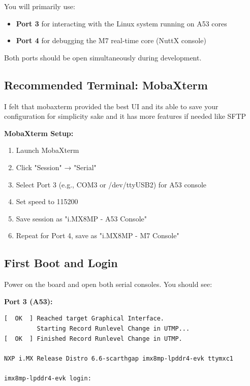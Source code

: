\documentclass[12pt,a4paper]{report}
\begin{document}
\begin{important}
You will primarily use:
\begin{itemize}
    \item \textbf{Port 3} for interacting with the Linux system running on A53 cores
    \item \textbf{Port 4} for debugging the M7 real-time core (NuttX console)
\end{itemize}
Both ports should be open simultaneously during development.
\end{important}


\subsection{Recommended Terminal: MobaXterm}

I felt that mobaxterm provided the best UI and its able to save your configuration for simplicity sake and it has more features if needed like SFTP


\textbf{MobaXterm Setup:}
\begin{enumerate}
    \item Launch MobaXterm
    \item Click "Session" → "Serial"
    \item Select Port 3 (e.g., COM3 or /dev/ttyUSB2) for A53 console
    \item Set speed to 115200
    \item Save session as "i.MX8MP - A53 Console"
    \item Repeat for Port 4, save as "i.MX8MP - M7 Console"
\end{enumerate}

\subsection{First Boot and Login}

Power on the board and open both serial consoles. You should see:

\textbf{Port 3 (A53):}
\begin{lstlisting}
[  OK  ] Reached target Graphical Interface.
         Starting Record Runlevel Change in UTMP...
[  OK  ] Finished Record Runlevel Change in UTMP.

NXP i.MX Release Distro 6.6-scarthgap imx8mp-lpddr4-evk ttymxc1

imx8mp-lpddr4-evk login:

\end{lstlisting}
\end{document}
